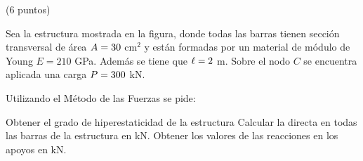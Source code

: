 \ejercicio (6 puntos)

Sea la estructura mostrada en la figura, donde todas las barras tienen sección transversal de área $A=30$ cm$^2$ y están formadas por un material de módulo de Young $E=210$ GPa. Además se tiene que $\ell =2 $ m. %
%
Sobre el nodo $C$ se encuentra aplicada una carga $P=300$ kN.

\begin{figure}[htb]
 \begin{center}
   \def\svgwidth{0.7\textwidth}
   
  \end{center}
\end{figure}

Utilizando el Método de las Fuerzas se pide:

\parte Obtener el grado de hiperestaticidad de la estructura
%
\parte Calcular la directa en todas las barras de la estructura en kN.
%
\parte Obtener los valores de las reacciones en los apoyos en kN.
%


